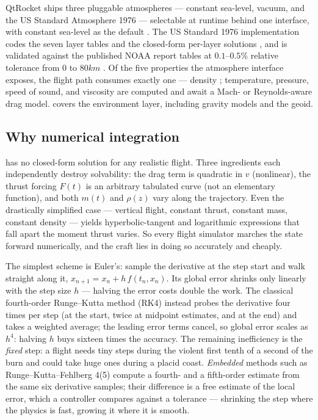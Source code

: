 QtRocket ships three pluggable atmospheres --- constant sea-level, vacuum, and the US
Standard Atmosphere 1976 --- selectable at runtime behind one interface, with constant
sea-level as the default . The US Standard 1976 implementation
codes the seven layer tables  and the closed-form
per-layer solutions , and is validated against the
published NOAA report tables at $0.1$--$0.5$\% relative tolerance from $0$ to $80\unit{km}$
. Of the five properties the atmosphere
interface exposes, the flight path consumes exactly one --- density
; temperature, pressure, speed of sound, and viscosity are
computed and await a Mach- or Reynolds-aware drag model.  covers the
environment layer, including gravity models and the geoid.

\subsection{Why numerical integration}\label{sec:primer-integration}

 has no closed-form solution for any realistic flight. Three
ingredients each independently destroy solvability: the drag term is quadratic in $v$
(nonlinear), the thrust forcing $F(t)$ is an arbitrary tabulated curve (not an elementary
function), and both $m(t)$ and $\rho(z)$ vary along the trajectory. Even the drastically
simplified case --- vertical flight, constant thrust, constant mass, constant density ---
yields hyperbolic-tangent and logarithmic expressions that fall apart the moment thrust
varies. So every flight simulator marches the state forward numerically, and the craft lies
in doing so accurately and cheaply.

\begin{physbox}
The simplest scheme is Euler's: sample the derivative at the step start and walk straight
along it, $x_{n+1} = x_n + h\,f(t_n, x_n)$. Its global error shrinks only linearly with the
step size $h$ --- halving the error costs double the work. The classical fourth-order
Runge--Kutta method (RK4) instead probes the derivative four times per step (at the start,
twice at midpoint estimates, and at the end) and takes a weighted average; the leading
error terms cancel, so global error scales as $h^4$: halving $h$ buys sixteen times the
accuracy. The remaining inefficiency is the \emph{fixed} step: a flight needs tiny steps
during the violent first tenth of a second of the burn and could take huge ones during a
placid coast. \emph{Embedded} methods such as Runge--Kutta--Fehlberg 4(5) compute a fourth-
and a fifth-order estimate from the same six derivative samples; their difference is a free
estimate of the local error, which a controller compares against a tolerance --- shrinking
the step where the physics is fast, growing it where it is smooth.
\end{physbox}

